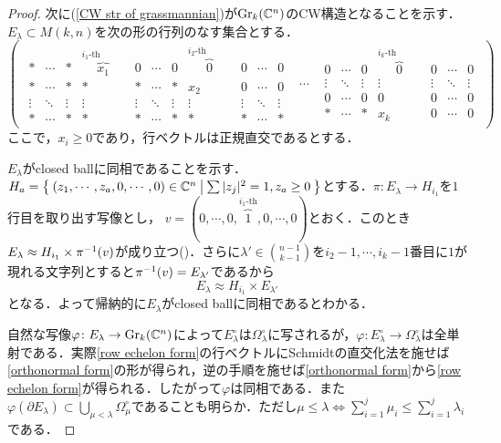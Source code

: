\begin{proof}
  次に(\ref{CW str of grassmannian})が$\text{Gr}_k(\mathbb{C}^n)$のCW構造となることを示す．$E_\lambda\subset M(k, n)$を次の形の行列のなす集合とする．
  \small
  \begin{equation}\label{orthonormal form}
  \left(\begin{array}{ccc}
    {\begin{array}{ccccccccccc}
    * & \cdots & * & \overbrace{x_1}^{i_1\text{-th column}} & 0 & \cdots & 0 & \overbrace{0}^{i_{2}\text{-th column}} & 0 & \cdots & 0\\
    * & \cdots & * & * & * & \cdots & * & x_2 & 0 & \cdots & 0\\
    \vdots & \ddots & \vdots & \vdots & \vdots & \ddots & \vdots & \vdots & \vdots & \ddots & \vdots\\
    * & \cdots & * & * & * & \cdots & * & * & * & \cdots & * 
    \end{array}} & \cdots & 
    {\begin{array}{ccccccc}
    0 & \cdots & 0 & \overbrace{0}^{i_{k}\text{-th column}} & 0 &\cdots & 0\\
    \vdots & \ddots & \vdots & \vdots & \vdots & \ddots & \vdots\\
    0 & \cdots & 0 & 0 & 0 & \cdots & 0\\
    * & \cdots & * & x_k & 0 & \cdots & 0
    \end{array}}
  \end{array}\right)
\end{equation}
\normalsize
  ここで，$x_i\geq 0$であり，行ベクトルは正規直交であるとする．
  
  $E_\lambda$がclosed ballに同相であることを示す．$H_{a}=\left\{\:(z_1,\cdots,z_{a},0,\cdots,0)\in\mathbb{C}^n\:\middle|\:\sum|z_j|^2=1,z_{a}\geq 0\:\right\}$とする．$\pi\colon E_\lambda\rightarrow H_{i_1}$を$1$行目を取り出す写像とし，
  $v=(0,\cdots,0,\overbrace{1}^{i_1\text{-th}},0,\cdots,0)$とおく．このとき$E_\lambda\approx H_{i_1}\times\pi^{-1}(v)$が成り立つ(\cite{hatcher VB})．さらに$\lambda'\in\binom{n-1}{k-1}$を$i_2-1,\cdots,i_k-1$番目に$1$が現れる文字列とすると$\pi^{-1}(v)=E_{\lambda'}$であるから
  \[
  E_\lambda\approx H_{i_1}\times E_{\lambda'}
  \]
  となる．よって帰納的に$E_\lambda$がclosed ballに同相であるとわかる．

  自然な写像$\varphi\colon E_\lambda\rightarrow\text{Gr}_k(\mathbb{C}^n)$によって$E_\lambda^\circ$は$\Omega_\lambda^\circ$に写されるが，$\varphi\colon E_\lambda^\circ\rightarrow\Omega_\lambda^\circ$は全単射である．実際\ref{row echelon form}の行ベクトルにSchmidtの直交化法を施せば\ref{orthonormal form}の形が得られ，逆の手順を施せば\ref{orthonormal form}から\ref{row echelon form}が得られる．したがって$\varphi$は同相である．また$\varphi(\partial E_\lambda)\subset \bigcup_{\mu < \lambda} \Omega_{\mu}^\circ$であることも明らか．ただし$\mu \leq \lambda \Leftrightarrow \sum_{i=1}^j\mu_i \leq \sum_{i=1}^j \lambda_i$である．
\end{proof}

